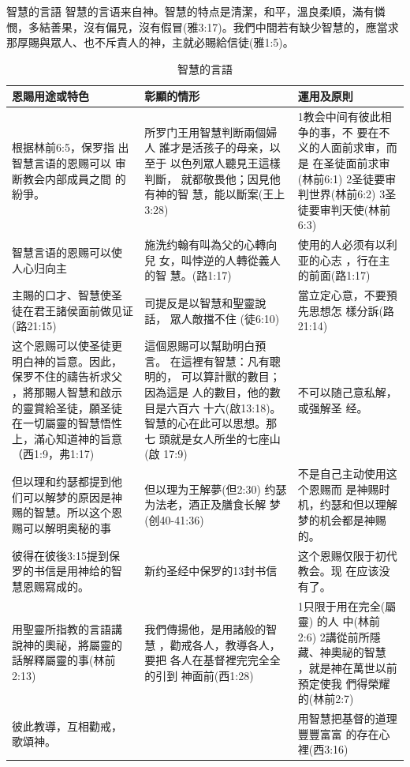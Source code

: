 智慧的言語
智慧的言语来自神。智慧的特点是清潔，和平，溫良柔順，滿有憐憫，多結善果，沒有偏見，沒有假冒(雅3:17)。我們中間若有缺少智慧的，應當求那厚賜與眾人、也不斥責人的神，主就必賜給信徒(雅1:5)。
\begin{table}[H]
  \centering
    \begin{tabular}{p{15.145em}|p{15.785em}|p{16.5em}}    \toprule
    \multicolumn{1}{p{15.145em}|}{\textbf{恩賜用途或特色}} & \multicolumn{1}{p{15.785em}|}{\textbf{彰顯的情形}} &  \multicolumn{1}{p{16.5em}}{\textbf{運用及原則}} \\    \midrule

根据林前6:5，保罗指
出智慧言语的恩赐可以
审断教会内部成員之間
的紛爭。& 所罗门王用智慧判断兩個婦人
誰才是活孩子的母亲，以至于
以色列眾人聽見王這樣判斷，
就都敬畏他；因見他有神的智
慧，能以斷案(王上3:28) &

1教会中间有彼此相争的事，不
要在不义的人面前求审，而是
在圣徒面前求审(林前6:1) 
2圣徒要审判世界(林前6:2) 
3圣徒要审判天使(林前6:3) \\\midrule

智慧言语的恩赐可以使
人心归向主&
施洗约翰有叫為父的心轉向兒
女，叫悖逆的人轉從義人的智
慧。(路1:17)&
使用的人必须有以利亚的心志
，行在主的前面(路1:17) \\\midrule

主賜的口才、智慧使圣
徒在君王諸侯面前做见证(路21:15)&
司提反是以智慧和聖靈說話，
眾人敵擋不住 (徒6:10)&
當立定心意，不要預先思想怎
樣分訴(路21:14)\\\midrule

这个恩赐可以使圣徒更
明白神的旨意。因此，
保罗不住的禱告祈求父
，將那賜人智慧和啟示
的靈賞給圣徒，願圣徒
在一切屬靈的智慧悟性
上，滿心知道神的旨意
（西1:9，弗1:17) &

這個恩賜可以幫助明白預言。
在這裡有智慧：凡有聰明的，
可以算計獸的數目；因為這是
人的數目，他的數目是六百六
十六(啟13:18)。
智慧的心在此可以思想。那七
頭就是女人所坐的七座山(啟
17:9)&
不可以随己意私解，或强解圣
经。\\\midrule

但以理和约瑟都提到他
们可以解梦的原因是神
赐的智慧。所以这个恩
赐可以解明奥秘的事&
但以理为王解夢(但2:30)
约瑟为法老，酒正及膳食长解
梦(创40-41:36)&
不是自己主动使用这个恩赐而
是神赐时机，约瑟和但以理解
梦的机会都是神赐的。\\\midrule

彼得在彼後3:15提到保
罗的书信是用神给的智
慧恩赐寫成的。&

新约圣经中保罗的13封书信&这个恩赐仅限于初代教会。现
在应该没有了。\\\midrule

用聖靈所指教的言語講
說神的奧祕，將屬靈的
話解釋屬靈的事(林前
2:13)&
我們傳揚他，是用諸般的智慧
，勸戒各人，教導各人，要把
各人在基督裡完完全全的引到
神面前(西1:28) &
1只限于用在完全(屬靈) 的人
中(林前2:6) 
2講從前所隱藏、神奧祕的智慧
，就是神在萬世以前預定使我
們得榮耀的(林前2:7) \\\midrule

彼此教導，互相勸戒，
歌頌神。&
&用智慧把基督的道理豐豐富富
的存在心裡(西3:16)\\\midrule
\end{tabular}%
\caption{智慧的言語}
\label{tab:addlabel}%
\end{table}%


